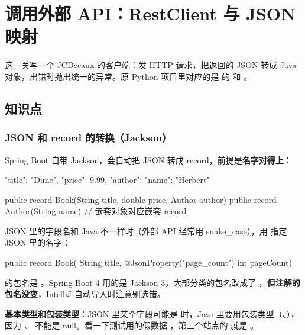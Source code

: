 \chapter{调用外部 API：RestClient 与 JSON 映射}

这一关写一个 JCDecaux 的客户端：发 HTTP 请求，把返回的 JSON 转成 Java 对象，出错时抛出统一的异常。原 Python 项目里对应的是  的  和 。


\section{知识点}

\subsection{JSON 和 record 的转换（Jackson）}

Spring Boot 自带 Jackson，会自动把 JSON 转成 record，前提是\textbf{名字对得上}：

\begin{jsoncode}
{ "title": "Dune", "price": 9.99, "author": { "name": "Herbert" } }
\end{jsoncode}

\begin{java}
public record Book(String title, double price, Author author) {
    public record Author(String name) {}      // 嵌套对象对应嵌套 record
}
\end{java}

JSON 里的字段名和 Java 不一样时（外部 API 经常用 snake\_case），用  指定 JSON 里的名字：

\begin{java}
public record Book(
        String title,
        @JsonProperty("page_count") int pageCount) {}
\end{java}

\begin{note}[包名]
 的包名是 。Spring Boot 4 用的是 Jackson 3，大部分类的包名改成了 ，\textbf{但注解的包名没变}，IntelliJ 自动导入时注意别选错。
\end{note}

\textbf{基本类型和包装类型}：JSON 里某个字段可能是  时，Java 里要用包装类型（、），因为 、 不能是 null。看一下测试用的假数据 ，第三个站点的  就是 。

